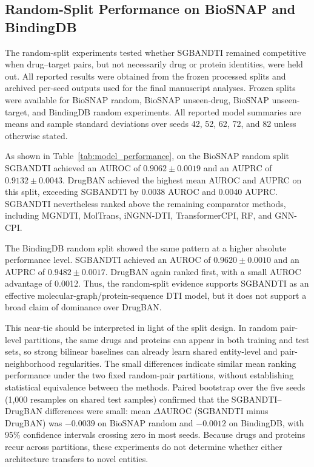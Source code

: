 \documentclass[computers,article,submit,moreauthors]{Definitions/mdpi}
\begin{document}
\subsection{Random-Split Performance on BioSNAP and BindingDB}
The random-split experiments tested whether SGBANDTI remained competitive when drug--target pairs, but not necessarily drug or protein identities, were held out. All reported results were obtained from the frozen processed splits and archived per-seed outputs used for the final manuscript analyses. Frozen splits were available for BioSNAP random, BioSNAP unseen-drug, BioSNAP unseen-target, and BindingDB random experiments. All reported model summaries are means and sample standard deviations over seeds 42, 52, 62, 72, and 82 unless otherwise stated.

As shown in Table~\ref{tab:model_performance}, on the BioSNAP random split SGBANDTI achieved an AUROC of $0.9062 \pm 0.0019$ and an AUPRC of $0.9132 \pm 0.0043$. DrugBAN achieved the highest mean AUROC and AUPRC on this split, exceeding SGBANDTI by 0.0038 AUROC and 0.0040 AUPRC. SGBANDTI nevertheless ranked above the remaining comparator methods, including MGNDTI, MolTrans, iNGNN-DTI, TransformerCPI, RF, and GNN-CPI.

The BindingDB random split showed the same pattern at a higher absolute performance level. SGBANDTI achieved an AUROC of $0.9620 \pm 0.0010$ and an AUPRC of $0.9482 \pm 0.0017$. DrugBAN again ranked first, with a small AUROC advantage of 0.0012. Thus, the random-split evidence supports SGBANDTI as an effective molecular-graph/protein-sequence DTI model, but it does not support a broad claim of dominance over DrugBAN.

This near-tie should be interpreted in light of the split design. In random pair-level partitions, the same drugs and proteins can appear in both training and test sets, so strong bilinear baselines can already learn shared entity-level and pair-neighborhood regularities. The small differences indicate similar mean ranking performance under the two fixed random-pair partitions, without establishing statistical equivalence between the methods. Paired bootstrap over the five seeds (1,000 resamples on shared test samples) confirmed that the SGBANDTI--DrugBAN differences were small: mean $\Delta$AUROC (SGBANDTI minus DrugBAN) was $-0.0039$ on BioSNAP random and $-0.0012$ on BindingDB, with 95\% confidence intervals crossing zero in most seeds. Because drugs and proteins recur across partitions, these experiments do not determine whether either architecture transfers to novel entities.
\end{document}
